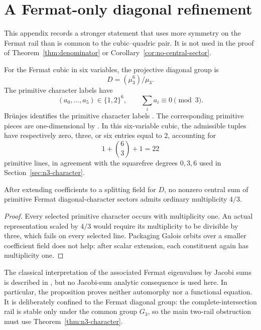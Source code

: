 \section{A Fermat-only diagonal refinement}
\label{app:fermat-refinement}

This appendix records a stronger statement that uses more symmetry on the
Fermat rail than is common to the cubic--quadric pair.  It is not used in
the proof of Theorem~\ref{thm:denominator} or
Corollary~\ref{cor:no-central-sector}.

For the Fermat cubic in six variables, the projective diagonal group is
\[
D=(\mu_3^6)/\mu_3.
\]
The primitive character labels have
\[
(a_0,\ldots,a_5)\in\{1,2\}^6,\qquad
\sum_i a_i\equiv0\pmod3.
\]
Br\"unjes identifies the primitive character labels
\cite[Lemma/Definition 4.3]{Brunjes2003}.  The corresponding primitive
pieces are one-dimensional by
\cite[Theorem 4.6]{Brunjes2003}.  In this six-variable cubic, the
admissible tuples have respectively zero, three, or six entries equal to
\(2\), accounting for
\[
1+\binom63+1=22
\]
primitive lines, in agreement with the squarefree degrees \(0,3,6\) used
in Section~\ref{sec:n3-character}.

\begin{proposition}
\label{prop:fermat-diagonal}
After extending coefficients to a splitting field for \(D\), no nonzero
central sum of primitive Fermat diagonal-character sectors admits ordinary
multiplicity \(4/3\).
\end{proposition}

\begin{proof}
Every selected primitive character occurs with multiplicity one.  An actual
representation scaled by \(4/3\) would require its multiplicity to be
divisible by three, which fails on every selected line.  Packaging Galois
orbits over a smaller coefficient field does not help: after scalar
extension, each constituent again has multiplicity one.
\end{proof}

The classical interpretation of the associated Fermat eigenvalues by Jacobi
sums is described in \cite{Weil1952,Brunjes2003}, but no Jacobi-sum
analytic consequence is used here.  In particular, the proposition proves
neither automorphy nor a functional equation.  It is deliberately confined
to the Fermat diagonal group: the complete-intersection rail is stable only
under the common group \(G_3\), so the main two-rail obstruction must use
Theorem~\ref{thm:n3-character}.
